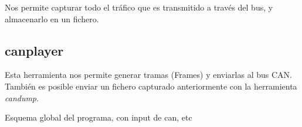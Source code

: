 Nos permite capturar todo el tráfico que es transmitido a través del bus, y almacenarlo en un fichero.

\subsection{canplayer}\label{canplayer}

Esta herramienta nos permite generar tramas (Frames) y enviarlas al bus CAN. También es posible enviar un fichero capturado anteriormente con la herramienta \emph{candump}.





Esquema global del programa, con input de can, etc


